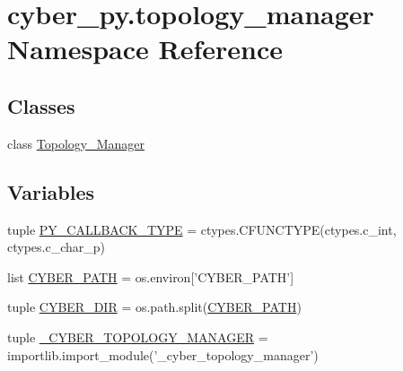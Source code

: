 \hypertarget{namespacecyber__py_1_1topology__manager}{\section{cyber\-\_\-py.\-topology\-\_\-manager Namespace Reference}
\label{namespacecyber__py_1_1topology__manager}
}
\subsection*{Classes}
\begin{DoxyCompactItemize}
\item 
class \hyperlink{classcyber__py_1_1topology__manager_1_1Topology__Manager}{Topology\-\_\-\-Manager}
\end{DoxyCompactItemize}
\subsection*{Variables}
\begin{DoxyCompactItemize}
\item 
tuple \hyperlink{namespacecyber__py_1_1topology__manager_a4ee80abb831591bc9da839434da76034}{P\-Y\-\_\-\-C\-A\-L\-L\-B\-A\-C\-K\-\_\-\-T\-Y\-P\-E} = ctypes.\-C\-F\-U\-N\-C\-T\-Y\-P\-E(ctypes.\-c\-\_\-int, ctypes.\-c\-\_\-char\-\_\-p)
\item 
list \hyperlink{namespacecyber__py_1_1topology__manager_a3c7fd6c5672ae028ac86aa7ba2b7765e}{C\-Y\-B\-E\-R\-\_\-\-P\-A\-T\-H} = os.\-environ\mbox{[}'C\-Y\-B\-E\-R\-\_\-\-P\-A\-T\-H'\mbox{]}
\item 
tuple \hyperlink{namespacecyber__py_1_1topology__manager_ae7b1f2ce4491d90c7609815a7c932b7e}{C\-Y\-B\-E\-R\-\_\-\-D\-I\-R} = os.\-path.\-split(\hyperlink{namespacecyber__py_1_1topology__manager_a3c7fd6c5672ae028ac86aa7ba2b7765e}{C\-Y\-B\-E\-R\-\_\-\-P\-A\-T\-H})
\item 
tuple \hyperlink{namespacecyber__py_1_1topology__manager_a33a8906bbdb4228ee8893e2513521887}{\-\_\-\-C\-Y\-B\-E\-R\-\_\-\-T\-O\-P\-O\-L\-O\-G\-Y\-\_\-\-M\-A\-N\-A\-G\-E\-R} = importlib.\-import\-\_\-module('\-\_\-cyber\-\_\-topology\-\_\-manager')
\end{DoxyCompactItemize}


